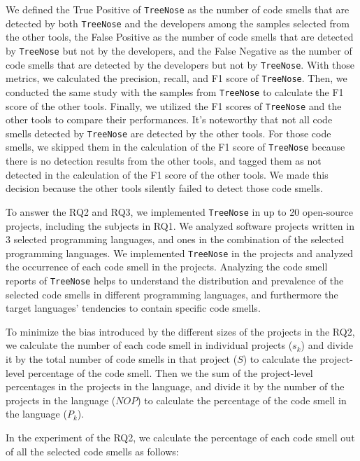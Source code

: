 We defined the True Positive of \texttt{TreeNose} as the number of code smells
that are detected by both \texttt{TreeNose} and the developers among the
samples selected from the other tools, the False Positive as the number of code
smells that are detected by \texttt{TreeNose} but not by the developers, and
the False Negative as the number of code smells that are detected by the
developers but not by \texttt{TreeNose}. With those metrics, we calculated the
precision, recall, and F1 score of \texttt{TreeNose}. Then, we conducted the
same study with the samples from \texttt{TreeNose} to calculate the F1 score of
the other tools. Finally, we utilized the F1 scores of \texttt{TreeNose} and
the other tools to compare their performances. It's noteworthy that not all
code smells detected by \texttt{TreeNose} are detected by the other tools. For
those code smells, we skipped them in the calculation of the F1 score of
\texttt{TreeNose} because there is no detection results from the other tools,
and tagged them as not detected in the calculation of the F1 score of the other
tools. We made this decision because the other tools silently failed to detect
those code smells.

To answer the RQ2 and RQ3, we implemented \texttt{TreeNose} in up to 20
open-source projects, including the subjects in RQ1. We analyzed software
projects written in 3 selected programming languages, and ones in the
combination of the selected programming languages. We implemented
\texttt{TreeNose} in the projects and analyzed the occurrence of each code
smell in the projects. Analyzing the code smell reports of \texttt{TreeNose}
helps to understand the distribution and prevalence of the selected code smells
in different programming languages, and furthermore the target languages'
tendencies to contain specific code smells.

To minimize the bias introduced by the different sizes of the projects in the
RQ2, we calculate the number of each code smell in individual projects
($s_{k}$) and divide it by the total number of code smells in that project
({$S$}) to calculate the project-level percentage of the code smell. Then we
the sum of the project-level percentages in the projects in the language, and
divide it by the number of the projects in the language ($NOP$) to calculate
the percentage of the code smell in the language ($P_{k}$).

In the experiment of the RQ2, we calculate the percentage of each code smell
out of all the selected code smells as follows:

